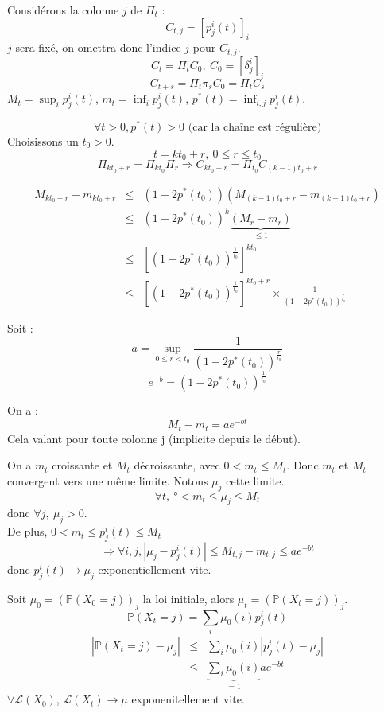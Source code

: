 
\begin{dem}
Considérons la colonne $j$ de $\Pi_t$ :
	\[C_{t,j}=[p^i_j(t)]_i\]
$j$ sera fixé, on omettra donc l'indice $j$ pour $C_{t,j}$.
\[C_t=\Pi_tC_0,\ C_0=[\delta_j^i]_i\]
\[C_{t+s}=\Pi_t\pi_sC_0=\Pi_tC_s\]
$M_t=\sup_i p_j^i(t)$, $m_t=\inf_i p_j^i(t)$, $p^*(t)=\inf_{i,j} p^i_j(t)$.

	\[\forall t>0, p^*(t)>0 \text{ (car la chaîne est régulière)}\]
Choisissons un $t_0>0$.
	\[t=kt_0+r,\ 0\leq r\leq t_0\]
	\[\Pi_{kt_0+r}=\Pi_{kt_0}\Pi_r \Rightarrow C_{kt_0+r}=\Pi_{t_0}C_{(k-1)t_0+r}\]

\begin{eqnarray*}
M_{kt_0+r}-m_{kt_0+r}&\leq& (1-2p^*(t_0))(M_{(k-1)t_0+r}-m_{(k-1)t_0+r})\\
			&\leq& (1-2p^*(t_0))^k\underbrace{(M_r-m_r)}_{\leq 1}\\
			&\leq& \left[(1-2p^*(t_0))^\frac{1}{t_0}\right]^{kt_0}\\
			&\leq& \left[(1-2p^*(t_0))^\frac{1}{t_0}\right]^{kt_0+r}\times \frac{1}{(1-2p^*(t_0))^\frac{r}{t_0}}
\end{eqnarray*}

Soit : \[a=\sup_{0\leq r<t_0} \frac{1}{(1-2p^*(t_0))^\frac{r}{t_0}}\]
	\[e^{-b}=(1-2p^*(t_0))^\frac{1}{t_0}\]

On a :
	\[M_t-m_t=ae^{-bt}\]
Cela valant pour toute colonne j (implicite depuis le début).

\bigskip
On a $m_t$ croissante et $M_t$ décroissante, avec $0<m_t\leq M_t$. Donc $m_t$ et $M_t$ convergent vers une même limite. Notons $\mu_j$ cette limite.
	\[\forall t,\ °<m_t\leq \mu_j\leq M_t\]
donc $\forall j,\ \mu_j>0$.\\
De plus, $0<m_t\leq p^i_j(t)\leq M_t$
	\[\Rightarrow \forall i,j, |\mu_j-p_j^i(t)|\leq M_{t,j}-m_{t,j}\leq ae^{-bt}\]
donc $p^i_j(t)\to \mu_j$ exponentiellement vite.

\bigskip
Soit $\mu_0=(\mathbb{P}(X_0=j))_j$ la loi initiale, alors $\mu_t=(\mathbb{P}(X_t=j))_j$.
	\[\mathbb{P}(X_t=j)=\sum_i \mu_0(i)p^i_j(t)\]
\begin{eqnarray*}
	|\mathbb{P}(X_t=j)-\mu_j|&\leq& \sum_i \mu_0(i)|p^i_j(t)-\mu_j| \\
				&\leq& \underbrace{\sum_i \mu_0(i)}_{=1} ae^{-bt}
\end{eqnarray*}
$\forall \mathcal{L}(X_0)$, $\mathcal{L}(X_t)\to \mu$ exponenitellement vite.


\end{dem}
